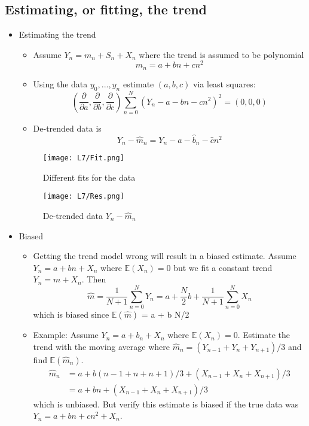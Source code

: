 \documentclass[12pt]{article}
\newcommand{\dydx}[2]{\frac{\partial{#1}}{\partial{#2}}}
\newcommand{\mexpval}[1]{\mathbb{E}(#1)}
\newcommand{\summ}[2]{\sum_{#1}^{#2}}
\begin{document}
\subsection{Estimating, or fitting, the trend}
\begin{itemize}
\item Estimating the trend
\begin{itemize}
    \item Assume $Y_n = m_n + S_n + X_n$ where the trend is assumed to be polynomial 
    \[
    m_n = a + b n + c n^2
    \]
    \item Using the data $y_0,...,y_n$ estimate $(a,b,c)$ via least squares:
    \[
    \left(\dydx{}{a}, \dydx{}{b}, \dydx{}{c} \right) \summ{n=0}{N}(Y_n - a -bn -c n^2)^2 = (0,0,0)
    \]
    \item De-trended data is 
    \[
    Y_n - \hat{m}_n = Y_n - \hat{a} - \hat{b}_n -\hat{c}n^2
    \]
\end{itemize}

    \begin{figure}[H]
    \centering
    \texttt{[image: L7/Fit.png]}
    \caption{Different fits for the data}
    \end{figure}
\begin{figure}[H]
    \centering
    \texttt{[image: L7/Res.png]}
    \caption{De-trended data $Y_n - \hat{m}_n$ }
\end{figure}
\item Biased 
\begin{itemize}
\item Getting the trend model wrong will result in a biased estimate. Assume $Y_n = a + bn +X_n$ where $\mexpval{X_n} = 0$ but we fit a constant trend $Y_n = m + X_n$. Then 
\[
\hat{m} = \frac{1}{N+1}\summ{n=0}{N} Y_n = a + \frac{N}{2}b +\frac{1}{N+1} \summ{n=0}{N}X_n
\]
which is biased since $\mexpval{\hat{m}}$ = a + b N/2
\item Example:
Assume $Y_n = a + b_n +X_n$ where $\mexpval{X_n} = 0.$ Estimate the trend with the moving average where $\hat{m}_n = (Y_{n-1} + Y_n + Y_{n+1})/3$ and find $\mexpval{\hat{m}_n}$.
\begin{align*}
    \hat{m}_n &= a + b(n-1 + n + n + 1)/3 + (X_{n-1} + X_n + X_{n+1})/3 \\
    & = a + bn + (X_{n-1} + X_n + X_{n+1})/3
\end{align*}
which is unbiased. But verify this estimate is biased if the true data was $Y_n = a + bn + cn^2 + X_n$.


\end{itemize}
\end{itemize}
\end{document}
